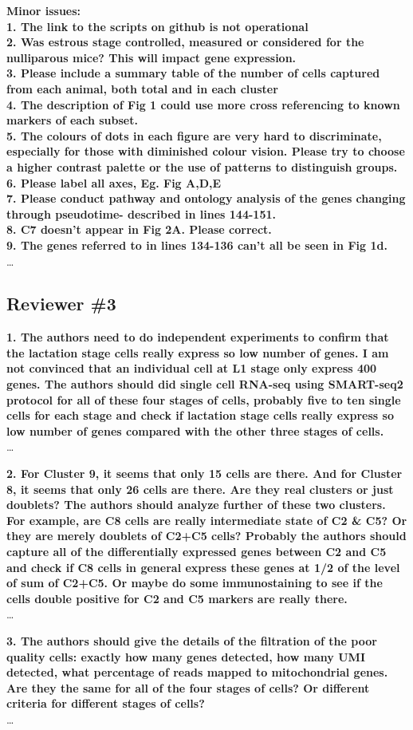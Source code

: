 \documentclass{article}
\begin{document}
\textbf{Minor issues: \\
1. The link to the scripts on github is not operational \\ 
2. Was estrous stage controlled, measured or considered for the nulliparous mice? This will impact gene expression. \\
3. Please include a summary table of the number of cells captured from each animal, both total and in each cluster \\
4. The description of Fig 1 could use more cross referencing to known markers of each subset. \\
5. The colours of dots in each figure are very hard to discriminate, especially for those with diminished colour vision. Please try to choose a higher contrast palette or the use of patterns to distinguish groups. \\
6. Please label all axes, Eg. Fig A,D,E \\
7. Please conduct pathway and ontology analysis of the genes changing through pseudotime- described in lines 144-151. \\
8. C7 doesn’t appear in Fig 2A. Please correct. \\
9. The genes referred to in lines 134-136 can’t all be seen in Fig 1d.}\\
\ldots


\subsection*{Reviewer \#3}
\textbf{1. The authors need to do independent experiments to confirm that the lactation stage cells really express so low number of genes. I am not convinced that an individual cell at L1 stage only express 400 genes. The authors should did single cell RNA-seq using SMART-seq2 protocol for all of these four stages of cells, probably five to ten single cells for each stage and check if lactation stage cells really express so low number of genes compared with the other three stages of cells.}\\
\ldots

\textbf{2. For Cluster 9, it seems that only 15 cells are there. And for Cluster 8, it seems that only 26 cells are there. Are they real clusters or just doublets? The authors should analyze further of these two clusters. For example, are C8 cells are really intermediate state of C2 \& C5? Or they are merely doublets of C2+C5 cells? Probably the authors should capture all of the differentially expressed genes between C2 and C5 and check if C8 cells in general express these genes at 1/2 of the level of sum of C2+C5. Or maybe do some immunostaining to see if the cells double positive for C2 and C5 markers are really there.}\\
\ldots

\textbf{3. The authors should give the details of the filtration of the poor quality cells: exactly how many genes detected, how many UMI detected, what percentage of reads mapped to mitochondrial genes. Are they the same for all of the four stages of cells? Or different criteria for different stages of cells?}\\
\ldots

\printbibliography
\end{document}
